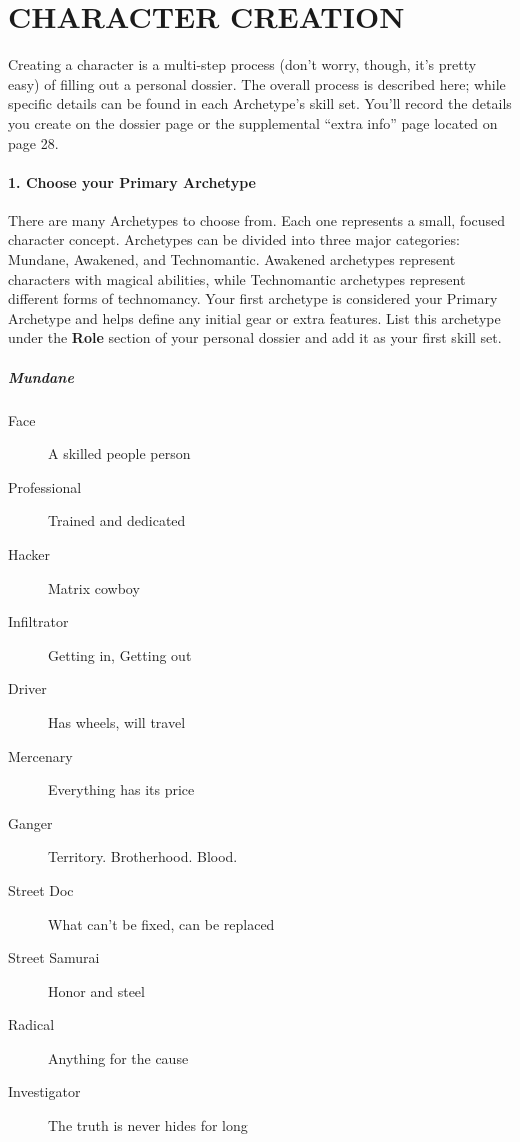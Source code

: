 \documentclass[oneside,10pt]{article}
\begin{document}
\section{CHARACTER CREATION}
\label{charactercreation}
\begin{multicols}{2}

Creating a character is a multi-step process (don’t worry,
though, it’s pretty easy) of filling out a personal dossier. The overall process is described
here; while specific details can be found in each Archetype’s skill set.
You’ll record the details you create on the dossier page or the
supplemental ``extra info'' page located on page 28.

\paragraph{1.  Choose your Primary Archetype}

There are many Archetypes to choose from. Each one represents a small,
focused character concept. Archetypes can be divided into three major
categories: Mundane, Awakened, and Technomantic. Awakened archetypes
represent characters with magical abilities, while Technomantic
archetypes represent different forms of technomancy. Your first
archetype is considered your Primary Archetype and helps define any
initial gear or extra features. List this archetype under the
\textbf{Role} section of your personal dossier and add it as your
first skill set.

\subparagraph{Mundane}

\begin{dent}
\begin{description}
\item[Face] A skilled people person
\item[Professional] Trained and dedicated
\item[Hacker] Matrix cowboy
\item[Infiltrator] Getting in, Getting out
\item[Driver] Has wheels, will travel
\item[Mercenary] Everything has its price
\item[Ganger] Territory. Brotherhood. Blood.
\item[Street Doc] What can't be fixed, can be replaced
\item[Street Samurai] Honor and steel
\item[Radical] Anything for the cause
\item[Investigator] The truth is never hides for long
\end{description}
\end{dent}


\end{multicols}
\end{document}
